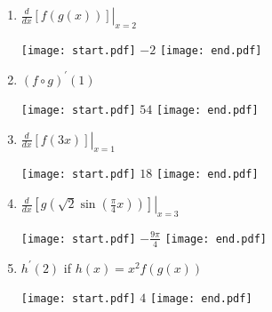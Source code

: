 \documentclass[12pt]{article}
\begin{document}
\begin{enumerate}
\begin{enumerate}

\item $\left.\frac{d}{dx}[f(g(x))]\right|_{x=2}$

\texttt{[image: start.pdf]}
{{$-2$}}
\texttt{[image: end.pdf]}


\item $(f \circ g)^{\prime}(1)$

\texttt{[image: start.pdf]}
{{$54$}}
\texttt{[image: end.pdf]}


\item $\left.\frac{d}{dx}[f(3x)]\right|_{x=1}$

\texttt{[image: start.pdf]}
{{$18$}}
\texttt{[image: end.pdf]}


\item $\left.\frac{d}{dx}\left[g\left(\sqrt{2}\sin{\left(\frac{\pi}{4}x\right)}\right)\right]\right|_{x=3}$

\texttt{[image: start.pdf]}
{{$-\frac{9\pi}{4}$}}
\texttt{[image: end.pdf]}


\item $h^{\prime}(2)$ if $h(x)=x^2f(g(x))$

\texttt{[image: start.pdf]}
{{$4$}}
\texttt{[image: end.pdf]}


\end{enumerate}

\end{enumerate}

\end{document}
